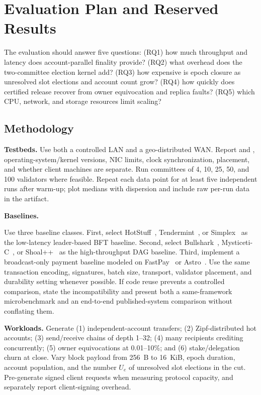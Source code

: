 \documentclass[sigplan,review,anonymous]{acmart}
\newcommand{\paragraphhead}[1]{\smallskip\noindent\textbf{#1}}
\begin{document}
\section{Evaluation Plan and Reserved Results}
\label{sec:eval}

The evaluation should answer five questions: (RQ1) how much throughput and latency does account-parallel finality provide? (RQ2) what overhead does the two-committee election kernel add? (RQ3) how expensive is epoch closure as unresolved slot elections and account count grow? (RQ4) how quickly does certified release recover from owner equivocation and replica faults? (RQ5) which CPU, network, and storage resources limit scaling?

\subsection{Methodology}

\paragraphhead{Testbeds.}
Use both a controlled LAN and a geo-distributed WAN.  Report \ImplMachine and \ImplRegions, operating-system/kernel versions, NIC limits, clock synchronization, placement, and whether client machines are separate.  Run committees of 4, 10, 25, 50, and 100 validators where feasible.  Repeat each data point for at least five independent runs after warm-up; plot medians with dispersion and include raw per-run data in the artifact.

\paragraphhead{Baselines.}
\begin{sloppypar}
Use three baseline classes. First, select HotStuff~\cite{yin2019hotstuff}, Tendermint~\cite{buchman2019tendermint}, or Simplex~\cite{chan2023simplex} as the low-latency leader-based BFT baseline. Second, select Bullshark~\cite{spiegelman2022bullshark}, Mysticeti-C~\cite{babel2025mysticeti}, or Shoal\allowbreak{}++~\cite{arun2025shoalpp} as the high-throughput DAG baseline. Third, implement a broadcast-only payment baseline modeled on FastPay~\cite{baudet2020fastpay} or Astro~\cite{collins2020astro}.  Use the same transaction encoding, signatures, batch size, transport, validator placement, and durability setting whenever possible.  If code reuse prevents a controlled comparison, state the incompatibility and present both a same-framework microbenchmark and an end-to-end published-system comparison without conflating them.
\end{sloppypar}

\paragraphhead{Workloads.}
Generate (1) independent-account transfers; (2) Zipf-distributed hot accounts; (3) send/receive chains of depth 1--32; (4) many recipients crediting concurrently; (5) owner equivocations at 0.01--10\%; and (6) stake/delegation churn at close.  Vary block payload from 256~B to 16~KiB, epoch duration, account population, and the number $U_e$ of unresolved slot elections in the cut.  Pre-generate signed client requests when measuring protocol capacity, and separately report client-signing overhead.
\end{document}
